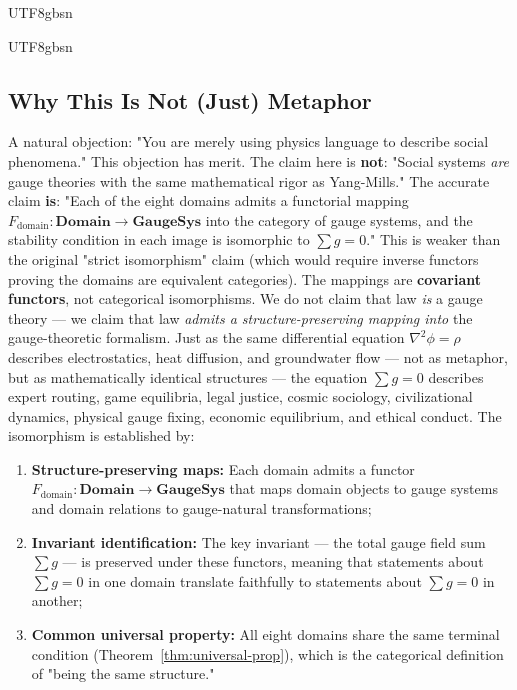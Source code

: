 \documentclass[11pt,a4paper]{article}
\begin{document}
\begin{CJK}{UTF8}{gbsn}
{\begin{CJK}{UTF8}{gbsn}
\subsection{Why This Is Not (Just) Metaphor}
A natural objection: "You are merely using physics language to describe social
phenomena." This objection has merit. The claim here is \textbf{not}: "Social systems 
\textit{are} gauge theories with the same mathematical rigor as Yang-Mills."
The accurate claim \textbf{is}: "Each of the eight domains admits a functorial mapping
$F_{\text{domain}}: \mathbf{Domain} \to \mathbf{GaugeSys}$ into the category of gauge
systems, and the stability condition in each image is isomorphic to $\sum g = 0$."
This is weaker than the original "strict isomorphism" claim (which would require
inverse functors proving the domains are equivalent categories). The mappings are
\textbf{covariant functors}, not categorical isomorphisms. We do not claim that
law \textit{is} a gauge theory — we claim that law \textit{admits a structure-preserving
mapping into} the gauge-theoretic formalism.
Just as the same differential equation $\nabla^2 \phi = \rho$ describes
electrostatics, heat diffusion, and groundwater flow --- not as metaphor, but
as mathematically identical structures --- the equation $\sum g = 0$ describes
expert routing, game equilibria, legal justice, cosmic sociology, civilizational
dynamics, physical gauge fixing, economic equilibrium, and ethical conduct.
The isomorphism is established by:
\begin{enumerate}[label=(\arabic*)]
    \item \textbf{Structure-preserving maps:} Each domain admits a functor
          $F_{\text{domain}}: \mathbf{Domain} \to \mathbf{GaugeSys}$ that
          maps domain objects to gauge systems and domain relations to
          gauge-natural transformations;
    \item \textbf{Invariant identification:} The key invariant --- the total
          gauge field sum $\sum g$ --- is preserved under these functors,
          meaning that statements about $\sum g = 0$ in one domain translate
          faithfully to statements about $\sum g = 0$ in another;
    \item \textbf{Common universal property:} All eight domains share the
          same terminal condition (Theorem~\ref{thm:universal-prop}), which
          is the categorical definition of "being the same structure."
\end{enumerate}

\end{CJK}}
\end{CJK}
\end{document}
